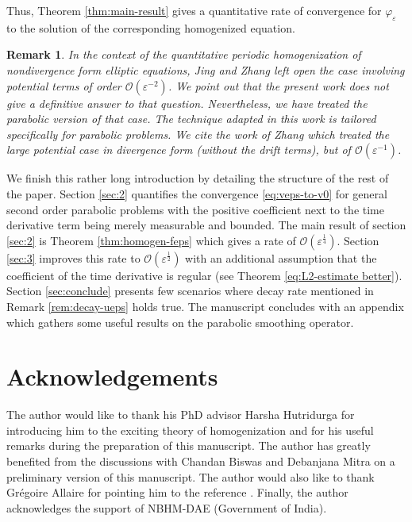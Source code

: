 \documentclass[preprint, 12pt]{amsart}
\numberwithin{equation}{section}
\newtheorem{remark}[theorem]{Remark}        %
\numberwithin{equation}{section}
\newcommand{\eps}{\varepsilon}
\begin{document}
Thus, Theorem \ref{thm:main-result} gives a quantitative rate of convergence for $\varphi_\eps$ to the solution of the corresponding homogenized equation.
\begin{remark}
In the context of the quantitative periodic homogenization of nondivergence form elliptic equations, Jing and Zhang \cite{jing2023periodic} left open the case involving potential terms of order $\mathcal{O}(\eps^{-2})$. We point out that the present work does not give a definitive answer to that question. Nevertheless, we have treated the parabolic version of that case. The technique adapted in this work is tailored specifically for parabolic problems. We cite the work of Zhang \cite{zhang2021estimates} which treated the large potential case in divergence form (without the drift terms), but of $\mathcal{O}(\eps^{-1})$.
\end{remark}
We finish this rather long introduction by detailing the structure of the rest of the paper. Section \ref{sec:2} quantifies the convergence \eqref{eq:veps-to-v0} for general second order parabolic problems with the positive coefficient next to the time derivative term being merely measurable and bounded. The main result of section \ref{sec:2} is Theorem \ref{thm:homogen-feps} which gives a rate of $\mathcal{O}(\eps^{\frac14})$. Section \ref{sec:3} improves this rate to $\mathcal{O}(\eps^\frac12)$ with an additional assumption that the coefficient of the time derivative is regular (see Theorem \ref{eq:L2-estimate better}). Section \ref{sec:conclude} presents few scenarios where decay rate mentioned in Remark \ref{rem:decay-ueps} holds true. The manuscript concludes with an appendix which gathers some useful results on the parabolic smoothing operator.
\section*{Acknowledgements}
The author would like to thank his PhD advisor Harsha Hutridurga for introducing him to the exciting theory of homogenization and for his useful remarks during the preparation of this manuscript. The author has greatly benefited from the discussions with Chandan Biswas and Debanjana Mitra on a preliminary version of this manuscript. The author would also like to thank Gr\'egoire Allaire for pointing him to the reference \cite{allaire2012homogenization}. Finally,  the author acknowledges the support of NBHM-DAE (Government of India).
\end{document}
